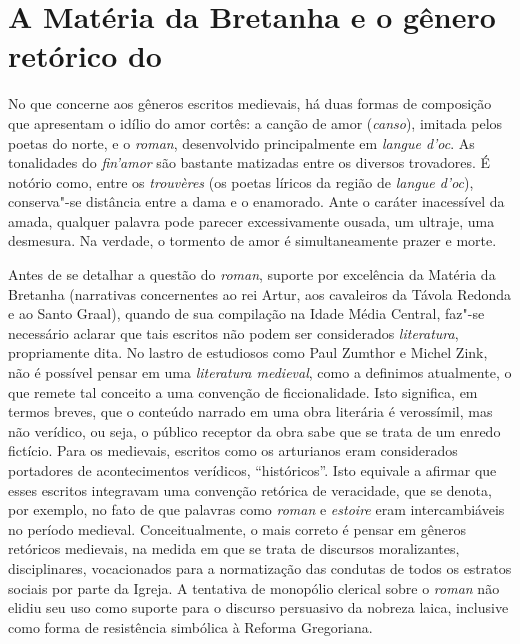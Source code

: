 \section{A Matéria da Bretanha e o gênero retórico do }

No que concerne aos gêneros escritos medievais, há duas formas de composição que
apresentam o idílio do amor cortês: a canção de amor (\textit{canso}),
imitada pelos poetas do norte, e o \textit{roman}, desenvolvido principalmente
em \textit{langue d’oc}. As tonalidades do \textit{fin’amor} são bastante
matizadas entre os diversos trovadores. É notório como, entre os
\textit{trouvères} (os poetas líricos da região de \textit{langue d’oc}),
conserva"-se distância entre a dama e o enamorado. Ante o caráter inacessível da
amada, qualquer palavra pode parecer excessivamente ousada, um ultraje, uma
desmesura. Na verdade, o tormento de amor é simultaneamente prazer e morte. 

Antes de se detalhar a questão do \textit{roman}, suporte por excelência da
Matéria da Bretanha (narrativas concernentes ao rei Artur, aos cavaleiros da
Távola Redonda e ao Santo Graal), quando de sua compilação na Idade Média
Central, faz"-se necessário aclarar que tais escritos não podem ser considerados
\textit{literatura}, propriamente dita. No lastro de estudiosos como Paul
Zumthor e Michel Zink, não é possível pensar em uma \textit{literatura medieval}, como a
definimos atualmente, o que remete tal conceito a uma convenção de
ficcionalidade. Isto significa, em termos breves, que o conteúdo narrado em uma
obra literária é verossímil, mas não verídico, ou seja, o público receptor da
obra sabe que se trata de um enredo fictício. Para os medievais, escritos
como os arturianos eram considerados portadores de acontecimentos verídicos,
“históricos”. Isto equivale a afirmar que esses escritos integravam uma
convenção retórica de veracidade, que se denota, por exemplo, no fato de que
palavras como \textit{roman} e \textit{estoire} eram intercambiáveis no período
medieval. Conceitualmente, o mais correto é pensar em gêneros retóricos
medievais, na medida em que se trata de discursos moralizantes, disciplinares,
vocacionados para a normatização das condutas de todos os estratos sociais por
parte da Igreja. A tentativa de monopólio clerical sobre o \textit{roman} não
elidiu seu uso como suporte para o discurso persuasivo da nobreza laica, inclusive
como forma de resistência simbólica à Reforma Gregoriana.

